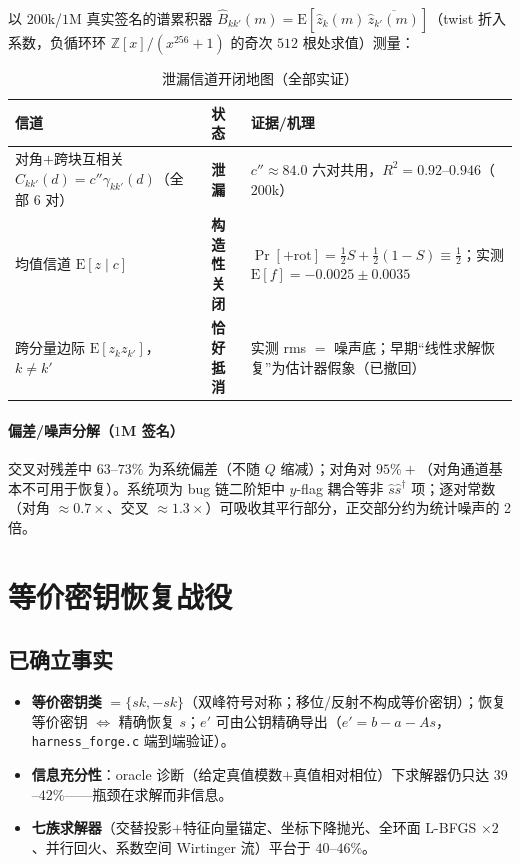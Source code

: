 \documentclass[11pt,a4paper]{ctexart}
\newcommand{\ZZ}{\mathbb{Z}}
\begin{document}
以 $200$k/$1$M 真实签名的谱累积器 $\hat B_{kk'}(m)=\mathrm{E}[\hat z_k(m)\,\overline{\hat z_{k'}(m)}]$（twist 折入系数，负循环环 $\ZZ[x]/(x^{256}+1)$ 的奇次 $512$ 根处求值）测量：

\begin{table}[h]\centering
\caption{泄漏信道开闭地图（全部实证）}\label{tab:channels}
\small\setlength{\tabcolsep}{4pt}
\begin{tabular}{p{5.2cm}p{2.0cm}p{7.3cm}}
\toprule
信道 & 状态 & 证据/机理\\
\midrule
对角$+$跨块互相关 $C_{kk'}(d)=c''\gamma_{kk'}(d)$（全部 $6$ 对） & \textbf{泄漏} & $c''\approx84.0$ 六对共用，$R^2=0.92$--$0.946$（$200$k）\\
均值信道 $\mathrm{E}[z\mid c]$ & \textbf{构造性关闭} & $\Pr[+\mathrm{rot}]=\tfrac12 S+\tfrac12(1-S)\equiv\tfrac12$；实测 $\mathrm{E}[f]=-0.0025\pm0.0035$\\
跨分量边际 $\mathrm{E}[z_kz_{k'}]$，$k\ne k'$ & \textbf{恰好抵消} & 实测 rms $=$ 噪声底；早期``线性求解恢复''为估计器假象（已撤回）\\
\bottomrule
\end{tabular}
\end{table}

\paragraph{偏差/噪声分解（$1$M 签名）} 交叉对残差中 $63$--$73\%$ 为系统偏差（不随 $Q$ 缩减）；对角对 $95\%+$（对角通道基本不可用于恢复）。系统项为 bug 链二阶矩中 $y$-flag 耦合等非 $\hat s\hat s^\dagger$ 项；逐对常数（对角 $\approx0.7\times$、交叉 $\approx1.3\times$）可吸收其平行部分，正交部分约为统计噪声的 2 倍。

\section{等价密钥恢复战役}\label{sec:recovery}

\subsection{已确立事实}

\begin{itemize}[nosep]
\item \textbf{等价密钥类} $=\{sk,-sk\}$（双峰符号对称；移位/反射不构成等价密钥）；恢复等价密钥 $\Leftrightarrow$ 精确恢复 $s$；$e'$ 可由公钥精确导出（$e'=b-a-As$，\texttt{harness\_forge.c} 端到端验证）。
\item \textbf{信息充分性}：oracle 诊断（给定真值模数$+$真值相对相位）下求解器仍只达 $39$--$42\%$——瓶颈在求解而非信息。
\item \textbf{七族求解器}（交替投影$+$特征向量锚定、坐标下降抛光、全环面 L-BFGS $\times2$、并行回火、系数空间 Wirtinger 流）平台于 $40$--$46\%$。
\end{itemize}
\end{document}
